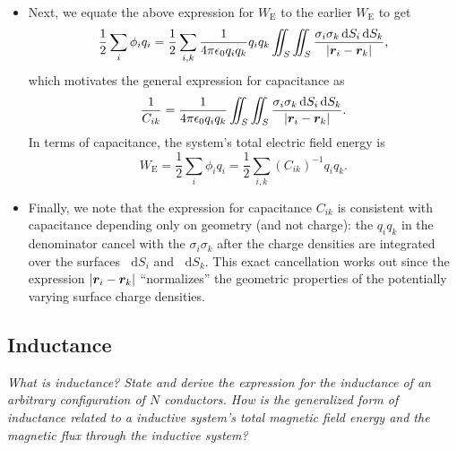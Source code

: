 \documentclass[11pt, a4paper]{article}
\newcommand{\diff}{\mathop{}\!\mathrm{d}} %
\renewcommand{\vec}[1]{\bm{#1}} %
\renewcommand{\r}{\vec{r}}
\newcommand{\ee}{\epsilon_{0}}  %
\begin{document}
\begin{itemize}
	\item Next, we equate the above expression for $ W_{\text{E}} $ to the earlier $ W_{\text{E}} $ to get
    \begin{equation*}
        \frac{1}{2} \sum_{i} \phi_{i}q_{i} = \frac{1}{2} \sum_{i, k} \frac{1}{4\pi \ee q_{i}q_{k}}q_{i}q_{k} \iint_{S} \iint_{S} \frac{\sigma_{i}\sigma_{k}\diff S_{i}\diff S_{k}}{\abs{\r_{i} - \r_{k}}},
    \end{equation*}
    which motivates the general expression for capacitance as
	\begin{equation*}
		\frac{1}{C_{ik}} = \frac{1}{4\pi \ee q_{i} q_{k}} \iint_{S} \iint_{S} \frac{\sigma_{i}\sigma_{k}\diff S_{i}\diff S_{k}}{\abs{\r_{i} - \r_{k}}}.
	\end{equation*}
	In terms of capacitance, the system's total electric field energy is
	\begin{equation*}
		W_{\text{E}} = \frac{1}{2}\sum_{i}\phi_{i}q_{i} = \frac{1}{2}\sum_{i, k}(C_{ik})^{-1}q_{i}q_{k}.
	\end{equation*}

	\item Finally, we note that the expression for capacitance $ C_{ik} $ is consistent with capacitance depending only on geometry (and not charge): the $ q_{i}q_{k} $ in the denominator cancel with the $ \sigma_{i} \sigma_{k} $ after the charge densities are integrated over the surfaces $ \diff S_{i} $ and $ \diff S_{k} $. This exact cancellation works out since the expression $ \abs{\r_{i} - \r_{k}} $ ``normalizes'' the geometric properties of the potentially varying surface charge densities. 

	
\end{itemize}

\subsection{Inductance}

\textit{What is inductance? State and derive the expression for the inductance of an arbitrary configuration of $ N $ conductors. How is the generalized form of inductance related to a inductive system's total magnetic field energy and the magnetic flux through the inductive system?}
\end{document}
